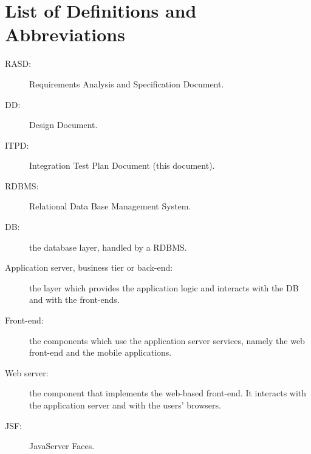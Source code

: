 \section{List of Definitions and Abbreviations}
\label{sec:definitions}

\begin{description}
\item[RASD:] Requirements Analysis and Specification Document.
\item[DD:] Design Document.
\item[ITPD:] Integration Test Plan Document (this document).
\item[RDBMS:] Relational Data Base Management System.
\item[DB:] the database layer, handled by a RDBMS.
\item[Application server, business tier or back-end:] the layer which provides the application logic and interacts with the DB and with the front-ends.
\item[Front-end:] the components which use the application server services, namely the web front-end and the mobile applications.
\item[Web server:] the component that implements the web-based front-end. It interacts with the application server and with the users' browsers.
\item[JSF:] JavaServer Faces.
\end{description}
